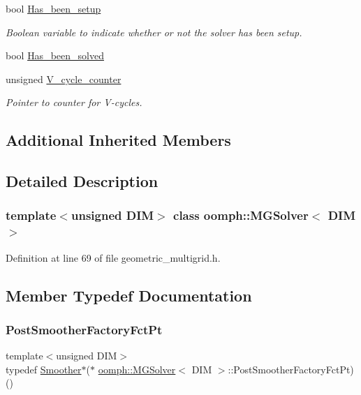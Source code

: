 \begin{DoxyCompactItemize}
bool \hyperlink{classoomph_1_1MGSolver_ae78a2b15951afde6d3e60bd9127fb978}{Has\+\_\+been\+\_\+setup}
\begin{DoxyCompactList}\small\item\em Boolean variable to indicate whether or not the solver has been setup. \end{DoxyCompactList}\item 
bool \hyperlink{classoomph_1_1MGSolver_af7b6c7e1c4e047f8c5a7c83e5b8169c7}{Has\+\_\+been\+\_\+solved}
\item 
unsigned \hyperlink{classoomph_1_1MGSolver_a29bdc90613e9759bd3fdff47a0c7c45a}{V\+\_\+cycle\+\_\+counter}
\begin{DoxyCompactList}\small\item\em Pointer to counter for V-\/cycles. \end{DoxyCompactList}\end{DoxyCompactItemize}
\subsection*{Additional Inherited Members}


\subsection{Detailed Description}
\subsubsection*{template$<$unsigned D\+IM$>$\newline
class oomph\+::\+M\+G\+Solver$<$ D\+I\+M $>$}



Definition at line 69 of file geometric\+\_\+multigrid.\+h.



\subsection{Member Typedef Documentation}
\mbox{\label{classoomph_1_1MGSolver_a72fa4eb80c0b5a0ec6811dcd92b30231}} 
\subsubsection{\texorpdfstring{Post\+Smoother\+Factory\+Fct\+Pt}{PostSmootherFactoryFctPt}}
{\footnotesize\ttfamily template$<$unsigned D\+IM$>$ \\
typedef \hyperlink{classoomph_1_1Smoother}{Smoother}$\ast$($\ast$ \hyperlink{classoomph_1_1MGSolver}{oomph\+::\+M\+G\+Solver}$<$ D\+IM $>$\+::Post\+Smoother\+Factory\+Fct\+Pt) ()}



